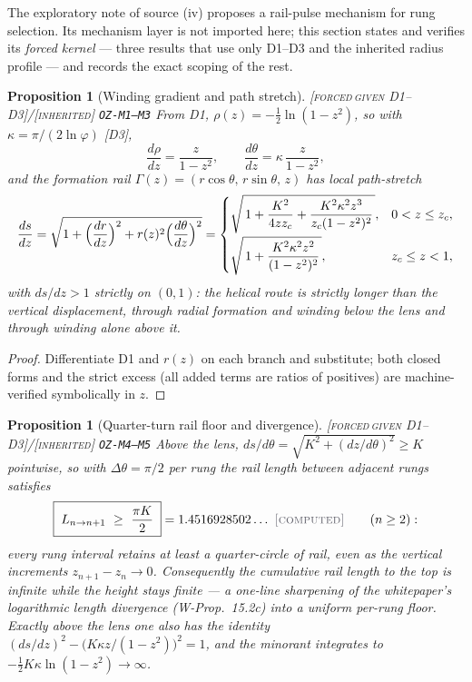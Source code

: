 \documentclass[11pt]{article}
\newcommand{\tagFD}{\textcolor{cF}{\textsc{[forced}}\,\textcolor{cD}{\textsc{given D1--D3]}}}
\newcommand{\tagC}{\textcolor{cC}{\textsc{[computed]}}}
\newcommand{\tagI}{\textcolor{cI}{\textsc{[inherited]}}}
\newcommand{\hx}[1]{\textcolor{cC}{\footnotesize\texttt{#1}}}
\newcommand{\gp}{\varphi}
\theoremstyle{plain}
\newtheorem{proposition}[theorem]{Proposition}
\theoremstyle{definition}
\theoremstyle{remark}
\begin{document}
The exploratory note of source (iv) proposes a rail-pulse mechanism for rung
selection. Its mechanism layer is not imported here; this section states and
verifies its \emph{forced kernel} --- three results that use only D1--D3 and
the inherited radius profile --- and records the exact scoping of the rest.

\begin{proposition}[Winding gradient and path stretch]\label{prop:pathstretch}\tagFD{}/\tagI{} \hx{OZ-M1--M3}
From D1, $\rho(z)=-\tfrac12\ln(1-z^2)$, so with $\kappa=\pi/(2\ln\gp)$ [D3],
\[
\frac{d\rho}{dz}=\frac{z}{1-z^2},
\qquad
\frac{d\theta}{dz}=\kappa\,\frac{z}{1-z^2},
\]
and the formation rail $\Gamma(z)=(r\cos\theta,\,r\sin\theta,\,z)$ has local
path-stretch
\[
\frac{ds}{dz}
=\sqrt{1+\Bigl(\frac{dr}{dz}\Bigr)^{2}+r(z)^2\Bigl(\frac{d\theta}{dz}\Bigr)^{2}}
=\begin{cases}
\sqrt{\,1+\dfrac{K^2}{4zz_c}+\dfrac{K^2\kappa^2z^3}{z_c(1-z^2)^2}\,},
& 0<z\le z_c,\\[10pt]
\sqrt{\,1+\dfrac{K^2\kappa^2z^2}{(1-z^2)^2}\,},
& z_c\le z<1,
\end{cases}
\]
with $ds/dz>1$ strictly on $(0,1)$: the helical route is strictly longer than
the vertical displacement, through radial formation and winding below the lens
and through winding alone above it.
\end{proposition}

\begin{proof}
Differentiate D1 and $r(z)$ on each branch and substitute; both closed forms
and the strict excess (all added terms are ratios of positives) are
machine-verified symbolically in $z$.
\end{proof}

\begin{proposition}[Quarter-turn rail floor and divergence]\label{prop:railfloor}\tagFD{}/\tagI{} \hx{OZ-M4--M5}
Above the lens, $ds/d\theta=\sqrt{K^2+(dz/d\theta)^2}\ge K$ pointwise, so with
$\Delta\theta=\pi/2$ per rung the rail length between adjacent rungs satisfies
\[
\boxed{\;L_{n\to n+1}\ \ge\ \frac{\pi K}{2}\;}=1.4516928502\ldots\ \tagC{}
\qquad(n\ge2):
\]
every rung interval retains at least a quarter-circle of rail, even as the
vertical increments $z_{n+1}-z_n\to0$. Consequently the cumulative rail length
to the top is infinite while the height stays finite --- a one-line sharpening
of the whitepaper's logarithmic length divergence (W-Prop.\ 15.2c) into a
uniform per-rung floor. Exactly above the lens one also has the identity
$(ds/dz)^2-\bigl(K\kappa z/(1-z^2)\bigr)^2=1$, and the minorant integrates to
$-\tfrac12K\kappa\ln(1-z^2)\to\infty$.
\end{proposition}
\end{document}

